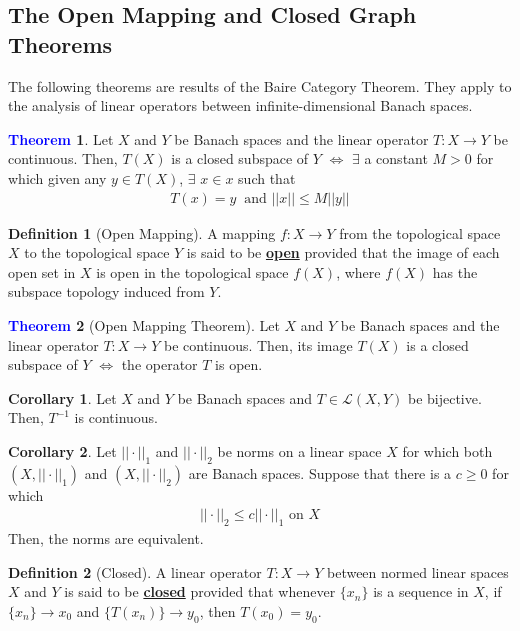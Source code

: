 \documentclass[11pt]{article}
\theoremstyle{definition}
\newcommand{\lop}[2]{\mathcal{L}(#1, #2)}
\theoremstyle{definition}
\newcommand{\dfn}[1]{\underline{\textbf{#1}}}
\newtheorem{theorem}{\textcolor{blue}{Theorem}}
\newtheorem{corollary}{Corollary}
\theoremstyle{definition}
\newtheorem{definition}{\textcolor{OliveGreen}{Definition}}
\theoremstyle{remark}
\begin{document}
\subsection{The Open Mapping and Closed Graph Theorems}
The following theorems are results of the Baire Category Theorem. They apply to the analysis of linear operators between infinite-dimensional Banach spaces. 

\begin{theorem}
	Let $X$ and $Y$ be Banach spaces and the linear operator $T: X \rightarrow Y$ be continuous. Then, $T(X)$ is a closed subspace of $Y$ $\iff$ $\exists$ a constant $M> 0$ for which given any $y \in T(X)$, $\exists$ $x \in x$ such that
	\begin{align*}
		T(x) = y\ \text{ and } ||x|| \leq M ||y||
	\end{align*}
\end{theorem}

\begin{definition}[Open Mapping]
	A mapping $f: X \rightarrow Y$ from the topological space $X$ to the topological space $Y$ is said to be \dfn{open} provided that the image of each open set in $X$ is open in the topological space $f(X)$, where $f(X)$ has the subspace topology induced from $Y$. 
\end{definition}

\begin{theorem}[Open Mapping Theorem]
	Let $X$ and $Y$ be Banach spaces and the linear operator $T: X \rightarrow Y$ be continuous. Then, its image $T(X)$ is a closed subspace of $Y$ $\iff$ the operator $T$ is open. 
\end{theorem}

\begin{corollary}
	Let $X$ and $Y$ be Banach spaces and $T \in \lop{X}{Y}$ be bijective. Then, $T^{-1}$ is continuous. 
\end{corollary}

\begin{corollary}
	Let $|| \cdot ||_1$ and $|| \cdot||_2$ be norms on a linear space $X$ for which both $(X, || \cdot ||_1)$ and $(X, || \cdot ||_2 )$ are Banach spaces. Suppose that there is a $c \geq 0$ for which 
	\begin{align}
		|| \cdot ||_2 \leq c || \cdot ||_1 \text{ on } X 	
	\end{align}
	Then, the norms are equivalent. 
\end{corollary}

\begin{definition}[Closed]
	A linear operator $T: X \rightarrow Y$ between normed linear spaces $X$ and $Y$ is said to be \dfn{closed} provided that whenever $\{ x_n \}$ is a sequence in $X$, if $\{ x_n \} \rightarrow x_0$ and $\{ T(x_n) \} \rightarrow y_0$, then $T(x_0) = y_0$. 
\end{definition}
\end{document}
